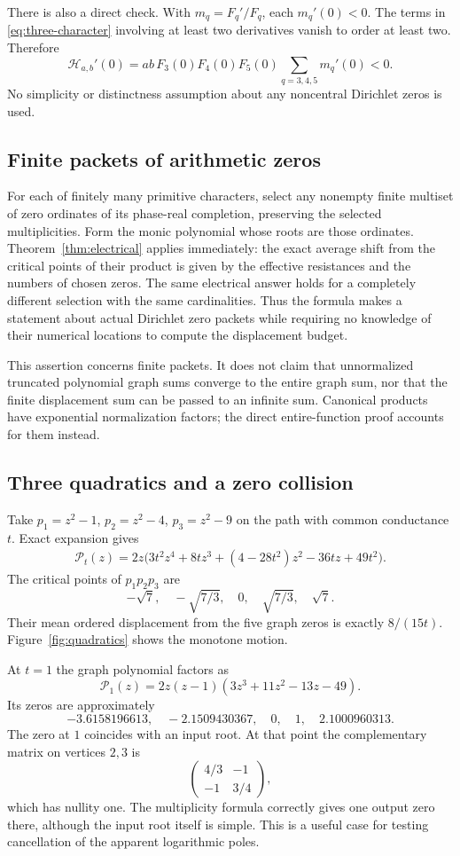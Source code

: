 There is also a direct check.  With $m_q=F_q'/F_q$, each $m_q'(0)<0$.
The terms in \eqref{eq:three-character} involving at least two derivatives
vanish to order at least two.  Therefore
\[
 \mathcal H_{a,b}'(0)=ab\,F_3(0)F_4(0)F_5(0)
                       \sum_{q=3,4,5}m_q'(0)<0.
\]
No simplicity or distinctness assumption about any noncentral Dirichlet
zeros is used.

\subsection{Finite packets of arithmetic zeros}

For each of finitely many primitive characters, select any nonempty finite
multiset of zero ordinates of its phase-real completion, preserving the
selected multiplicities.  Form the monic polynomial whose roots are those
ordinates.  Theorem~\ref{thm:electrical} applies immediately: the exact
average shift from the critical points of their product is given by the
effective resistances and the numbers of chosen zeros.  The same
electrical answer holds for a completely different selection with the
same cardinalities.  Thus the formula makes a statement about actual
Dirichlet zero packets while requiring no knowledge of their numerical
locations to compute the displacement budget.

This assertion concerns finite packets.  It does not claim that unnormalized
truncated polynomial graph sums converge to the entire graph sum, nor
that the finite displacement sum can be passed to an infinite sum.
Canonical products have exponential normalization factors; the direct
entire-function proof accounts for them instead.

\subsection{Three quadratics and a zero collision}

Take $p_1=z^2-1$, $p_2=z^2-4$, $p_3=z^2-9$ on the path with common
conductance $t$.  Exact expansion gives
\begin{align*}
 \mathcal P_t(z)
 =2z\bigl(3t^2z^4+8tz^3+(4-28t^2)z^2-36tz+49t^2\bigr).
\end{align*}
The critical points of $p_1p_2p_3$ are
\[
 -\sqrt7,\quad-\sqrt{7/3},\quad0,\quad\sqrt{7/3},\quad\sqrt7.
\]
Their mean ordered displacement from the five graph zeros is exactly
$8/(15t)$.  Figure~\ref{fig:quadratics} shows the monotone motion.

At $t=1$ the graph polynomial factors as
\[
 \mathcal P_1(z)=2z(z-1)(3z^3+11z^2-13z-49).
\]
Its zeros are approximately
\[
 -3.6158196613,\quad-2.1509430367,\quad0,\quad1,\quad2.1000960313.
\]
The zero at $1$ coincides with an input root.  At that point the
complementary matrix on vertices $2,3$ is
\[
 \begin{pmatrix}4/3&-1\\-1&3/4\end{pmatrix},
\]
which has nullity one.  The multiplicity formula correctly gives one
output zero there, although the input root itself is simple.  This is a
useful case for testing cancellation of the apparent logarithmic poles.


